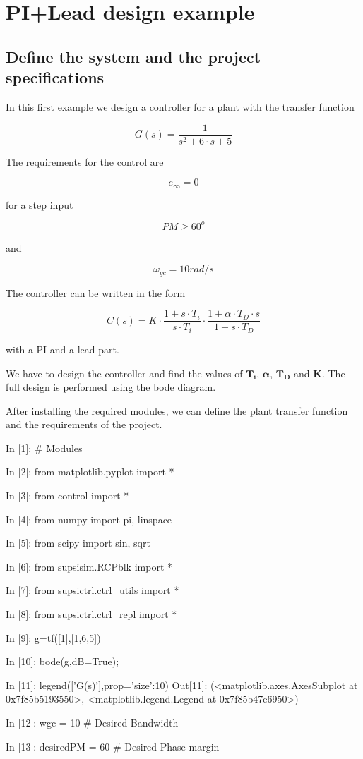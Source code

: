 \section{PI+Lead design example}

\subsection{Define the system and the project specifications}

In this first example we design a controller for a plant with the transfer function
 
$$
G(s)=\frac{1}{s^2 + 6\cdot s + 5}
$$
 
The requirements for the control are
 
$$
e_{\infty} = 0
$$ 
 
for a step input
 
$$
PM\geq60^o
$$
 
and
 
$$
\omega_{gc} = 10rad/s
$$

The controller can be written in the form

$$
C(s) = K \cdot \frac{1+s \cdot T_i}{s \cdot T_i} \cdot \frac{1+\alpha \cdot T_D 
\cdot s}{1+ s \cdot T_D}
$$

with a PI and a lead part.

We have to design the controller and find the values of $\mathbf{T_i}$, 
$\mathbf{\alpha}$, 
$\mathbf{T_D}$ and $\mathbf{K}$. The full design is performed using the bode 
diagram.

After installing the required modules, we can define the plant transfer 
function and the requirements of the project.
 
\begin{code}
In [1]: # Modules

In [2]: from matplotlib.pyplot import *

In [3]: from control import *

In [4]: from numpy import pi, linspace

In [5]: from scipy import sin, sqrt

In [6]: from supsisim.RCPblk import *

In [7]: from supsictrl.ctrl_utils import *

In [8]: from supsictrl.ctrl_repl import *

In [9]: g=tf([1],[1,6,5])

In [10]: bode(g,dB=True);

In [11]: legend(['G(s)'],prop={'size':10})
Out[11]: 
(<matplotlib.axes.AxesSubplot at 0x7f85b5193550>,
 <matplotlib.legend.Legend at 0x7f85b47e6950>)

In [12]: wgc = 10         # Desired Bandwidth

In [13]: desiredPM = 60   # Desired Phase margin
\end{code}

